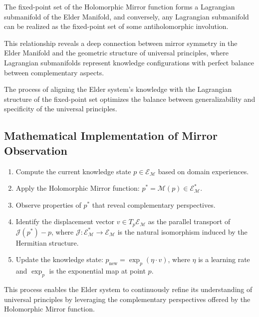 \begin{theorem}
The fixed-point set of the Holomorphic Mirror function forms a Lagrangian submanifold of the Elder Manifold, and conversely, any Lagrangian submanifold can be realized as the fixed-point set of some antiholomorphic involution.
\end{theorem}

This relationship reveals a deep connection between mirror symmetry in the Elder Manifold and the geometric structure of universal principles, where Lagrangian submanifolds represent knowledge configurations with perfect balance between complementary aspects.

\begin{proposition}
The process of aligning the Elder system's knowledge with the Lagrangian structure of the fixed-point set optimizes the balance between generalizability and specificity of the universal principles.
\end{proposition}

\subsection{Mathematical Implementation of Mirror Observation}

\begin{theorem}
\begin{enumerate}
\item Compute the current knowledge state $p \in \mathcal{E}_{\mathcal{M}}$ based on domain experiences.
\item Apply the Holomorphic Mirror function: $p^* = \mathcal{M}(p) \in \mathcal{E}_{\mathcal{M}}^*$.
\item Observe properties of $p^*$ that reveal complementary perspectives.
\item Identify the displacement vector $v \in T_p\mathcal{E}_{\mathcal{M}}$ as the parallel transport of $\mathcal{J}(p^*) - p$, where $\mathcal{J}: \mathcal{E}_{\mathcal{M}}^* \rightarrow \mathcal{E}_{\mathcal{M}}$ is the natural isomorphism induced by the Hermitian structure.
\item Update the knowledge state: $p_{\text{new}} = \exp_p(\eta \cdot v)$, where $\eta$ is a learning rate and $\exp_p$ is the exponential map at point $p$.
\end{enumerate}
\end{theorem}

This process enables the Elder system to continuously refine its understanding of universal principles by leveraging the complementary perspectives offered by the Holomorphic Mirror function.

